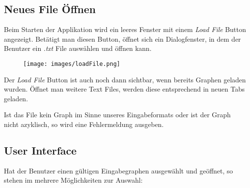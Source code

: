 
\subsection*{Neues File Öffnen}
Beim Starten der Applikation wird ein leeres Fenster mit einem \textit{Load File} Button angezeigt. Betätigt man diesen Button, öffnet sich ein Dialogfenster, in dem der Benutzer ein \textit{.txt} File auswählen und öffnen kann. 

\begin{figure}[h!]
    \centering
    \texttt{[image: images/loadFile.png]}
\end{figure}

Der \textit{Load File} Button ist auch noch dann sichtbar, wenn bereits Graphen geladen wurden. Öffnet man weitere Text Files, werden diese entsprechend in neuen Tabs geladen.

Ist das File kein Graph im Sinne unseres Eingabeformats oder ist der Graph nicht azyklisch, so wird eine Fehlermeldung ausgeben.

\subsection*{User Interface}

Hat der Benutzer einen gültigen Eingabegraphen ausgewählt und geöffnet, so stehen im mehrere Möglichkeiten zur Auswahl:

